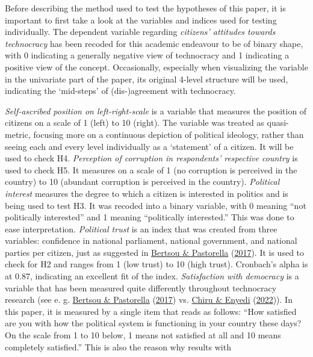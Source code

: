 \documentclass[
  12pt,
  english,
]{article}
\begin{document}
Before describing the method used to test the hypotheses of this paper,
it is important to first take a look at the variables and indices used
for testing individually. The dependent variable regarding
\emph{citizens' attitudes towards technocracy} has been recoded for this
academic endeavour to be of binary shape, with 0 indicating a generally
negative view of technocracy and 1 indicating a positive view of the
concept. Occasionally, especially when visualizing the variable in the
univariate part of the paper, its original 4-level structure will be
used, indicating the `mid-steps' of (dis-)agreement with technocracy.

\emph{Self-ascribed position on left-right-scale} is a variable that
measures the position of citizens on a scale of 1 (left) to 10 (right).
The variable was treated as quasi-metric, focusing more on a continuous
depiction of political ideology, rather than seeing each and every level
individually as a `statement' of a citizen. It will be used to check H4.
\emph{Perception of corruption in respondents' respective country} is
used to check H5. It measures on a scale of 1 (no corruption is
perceived in the country) to 10 (abundant corruption is perceived in the
country). \emph{Political interest} measures the degree to which a
citizen is interested in politics and is being used to test H3. It was
recoded into a binary variable, with 0 meaning ``not politically
interested'' and 1 meaning ``politically interested.'' This was done to
ease interpretation. \emph{Political trust} is an index that was created
from three variables: confidence in national parliament, national
government, and national parties per citizen, just as suggested in
\protect\hyperlink{ref-bertsou2017technocratic}{Bertsou \& Pastorella}
(\protect\hyperlink{ref-bertsou2017technocratic}{2017}). It is used to
check for H2 and ranges from 1 (low trust) to 10 (high trust).
Cronbach's alpha is at 0.87, indicating an excellent fit of the index.
\emph{Satisfaction with democracy} is a variable that has been measured
quite differently throughout technocracy research (see e. g.
\protect\hyperlink{ref-bertsou2017technocratic}{Bertsou \& Pastorella}
(\protect\hyperlink{ref-bertsou2017technocratic}{2017}) vs.
\protect\hyperlink{ref-chiru2022wants}{Chiru \& Enyedi}
(\protect\hyperlink{ref-chiru2022wants}{2022})). In this paper, it is
measured by a single item that reads as follows: ``How satisfied are you
with how the political system is functioning in your country these days?
On the scale from 1 to 10 below, 1 means not satisfied at all and 10
means completely satisfied.'' This is also the reason why results with
\end{document}
